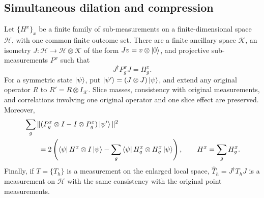 \documentclass[11pt]{article}
\theoremstyle{definition}
\newcommand{\calH}{\mathcal{H}}
\begin{document}
\subsection{Simultaneous dilation and compression}
\label{sec:self-improvement-dilation}

\begin{lemma}
\label{lem:simultaneous-dilation-compression}
Let $\{H^x\}_x$ be a finite family of sub-measurements on a
finite-dimensional space $\calH$, with one common finite outcome
set.  There are a finite ancillary space $\mathcal{K}$, an isometry
$J:\calH\longrightarrow\calH\otimes\mathcal{K}$ of the form
$Jv=v\otimes\ket0$, and projective sub-measurements $P^x$ such that
\[
 J^\dagger P_g^xJ=H_g^x.
\]
For a symmetric state $\ket\psi$, put
$\ket{\psi'}=(J\otimes J)\ket\psi$, and extend any original operator
$R$ to $R'=R\otimes I_{\mathcal{K}}$.  Slice masses, consistency with
original measurements, and correlations involving one original
operator and one slice effect are preserved.  Moreover,
\begin{equation}\label{eq:dilation-mirror-defect}
 \begin{split}
 &\sum_g\|(P_g^x\otimes I-I\otimes P_g^x)\ket{\psi'}\|^2\\
 &\qquad=2\left(\bra\psi H^x\otimes I\ket\psi
       -\sum_g\bra\psi H_g^x\otimes H_g^x\ket\psi\right),
 \qquad H^x=\sum_gH_g^x.
 \end{split}
\end{equation}
Finally, if $T=\{T_h\}$ is a measurement on the enlarged local
space, $\widehat T_h=J^\dagger T_hJ$ is a measurement on $\calH$
with the same consistency with the original point measurements.
\end{lemma}
\end{document}
